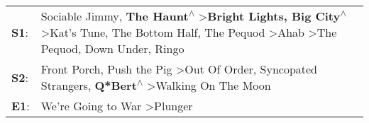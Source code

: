 \begin{supertabular}{p{0.03\textwidth}p{0.92\textwidth}}
 \textbf{S1}:  &  Sociable Jimmy\textsuperscript{}, \enspace \textbf{The Haunt\textsuperscript{$\wedge$}} \textgreater \enspace \textbf{Bright Lights, Big City\textsuperscript{$\wedge$}} \textgreater \enspace Kat's Tune\textsuperscript{}, \enspace The Bottom Half\textsuperscript{}, \enspace The Pequod\textsuperscript{} \textgreater \enspace Ahab\textsuperscript{} \textgreater \enspace The Pequod\textsuperscript{}, \enspace Down Under\textsuperscript{}, \enspace Ringo\textsuperscript{}  \enspace  \\
 \textbf{S2}:  &                                                                                                                                                                                             Front Porch\textsuperscript{}, \enspace Push the Pig\textsuperscript{} \textgreater \enspace Out Of Order\textsuperscript{}, \enspace Syncopated Strangers\textsuperscript{}, \enspace \textbf{Q*Bert\textsuperscript{$\wedge$}} \textgreater \enspace Walking On The Moon\textsuperscript{}  \enspace  \\
 \textbf{E1}:  &                                                                                                                                                                                                                                                                                                                                                                                                     We're Going to War\textsuperscript{} \textgreater \enspace Plunger\textsuperscript{}  \enspace  \\
\end{supertabular}
